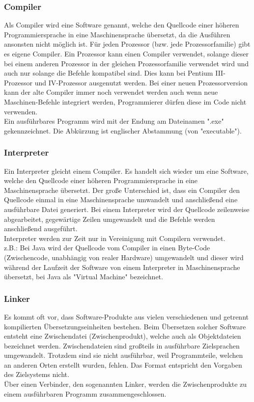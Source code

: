 \documentclass[12pt,a4paper]{report}
\begin{document}
\begin{onehalfspace}
\subsubsection{Compiler}
Als Compiler wird eine Software genannt, welche den Quellcode einer höheren Programmiersprache in eine Maschinensprache übersetzt, da die Ausführen ansonsten nicht möglich ist. Für jeden Prozessor (bzw. jede Prozessorfamilie) gibt es eigene Compiler. Ein Prozessor kann einen Compiler verwendet, solange dieser bei einem anderen Prozessor in der gleichen Prozessorfamilie verwendet wird und auch nur solange die Befehle kompatibel sind. Dies kann bei Pentium III-Prozessor und IV-Prozessor ausgenutzt werden. Bei einer neuen Prozessorversion kann der alte Compiler immer noch verwendet werden auch wenn neue Maschinen-Befehle integriert werden, Programmierer dürfen diese im Code nicht verwenden.\\
Ein ausführbares Programm wird mit der Endung am Dateinamen "{}.exe"{} gekennzeichnet. Die Abkürzung ist englischer Abstammung (von "{}executable"{}).

\subsubsection{Interpreter}
Ein Interpreter gleicht einem Compiler. Es handelt sich wieder um eine Software, welche den Quellcode einer höheren Programmiersprache in eine Maschinensprache übersetzt. Der große Unterschied ist, dass ein Compiler den Quellcode einmal in eine Maschinensprache umwandelt und anschließend eine ausführbare Datei generiert. Bei einem Interpreter wird der Quellcode zeilenweise abgearbeitet, gegewärtige Zeilen umgewandelt und die Befehle werden anschließend ausgeführt.
\\Interpreter werden zur Zeit nur in Vereinigung mit Compilern verwendet. \\
z.B.: Bei Java wird der Quellcode vom Compiler in einen Byte-Code (Zwischencode, unabhängig von realer Hardware) umgewandelt und dieser wird während der Laufzeit der Software von einem Interpreter in Maschinensprache übersetzt, bei Java als "{}Virtual Machine"{} bezeichnet.

\subsubsection{Linker}
Es kommt oft vor, dass Software-Produkte aus vielen verschiedenen und getrennt kompilierten Übersetzungseinheiten bestehen. Beim Übersetzen solcher Software entsteht eine Zwischendatei (Zwischenprodukt), welche auch als Objektdateien bezeichnet werden. Zwischendateien sind großteils in ausführbare Zielsprachen umgewandelt. Trotzdem sind sie nicht ausführbar, weil Programmteile, welchen an anderen Orten erstellt wurden, fehlen. Das Format entspricht den Vorgaben des Zielsystems nicht.
\\Über einen Verbinder, den sogenannten Linker, werden die Zwischenprodukte zu einem ausführbaren Programm zusammengeschlossen.


\end{onehalfspace}
\end{document}
